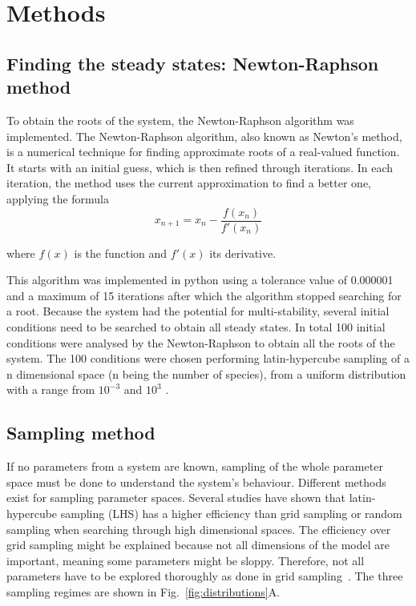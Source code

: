 \chapter{Methods}
\section{Finding the steady states: Newton-Raphson method}\label{newton_raphson}

To obtain the roots of the system, the Newton-Raphson algorithm was implemented.
The Newton-Raphson algorithm, also known as Newton's method, is a numerical technique for finding approximate roots of a real-valued function. It starts with an initial guess, which is then refined through iterations. In each iteration, the method uses the current approximation to find a better one, applying the formula
\begin{equation}
x_{n+1} = x_{n} - \frac{f(x_{n})}{f'(x_{n})}
\end{equation}

where $f(x)$ is the function and $f'(x)$ its derivative.

This algorithm was implemented in python using a tolerance value of 0.000001 and a maximum of 15 iterations after which the algorithm stopped searching for a root.
Because the system had the potential for multi-stability, several initial conditions need to be searched to obtain all steady states.
In total 100 initial conditions were analysed by the Newton-Raphson to obtain all the roots of the system.
The 100 conditions were chosen performing latin-hypercube sampling of a n dimensional space (n being the number of species), from a uniform distribution with a range from $10^{-3}$ and $10^3$ .
\section{Sampling method}\label{sampling method}
If no parameters from a system are known, sampling of the whole parameter space must be done to understand the system's behaviour.
Different methods exist for sampling parameter spaces.
Several studies have shown that latin-hypercube sampling (LHS) has a higher efficiency than grid sampling or random sampling when searching through high dimensional spaces.
The efficiency over grid sampling might be explained because not all dimensions of the model are important, meaning some parameters might be sloppy.
Therefore, not all parameters have to be explored thoroughly as done in grid sampling~\parencite{Iman2014, Bergstra2012}.
The three sampling regimes are shown in Fig.~\ref{fig:distributions}A.

